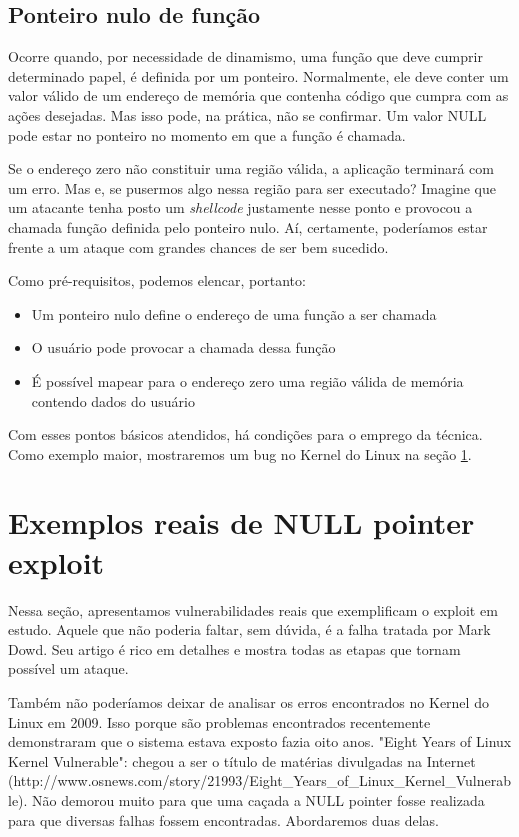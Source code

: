 			
		\subsection{Ponteiro nulo de função}
			Ocorre quando, por necessidade de dinamismo, uma função que deve cumprir determinado
			papel, é definida por um ponteiro. Normalmente, ele deve conter um valor válido
			de um endereço de memória que contenha código que cumpra com as ações desejadas.
			Mas isso pode, na prática, não se confirmar. Um valor NULL pode estar no ponteiro
			no momento em que a função é chamada.

			
			Se o endereço zero não constituir uma região válida, a aplicação terminará com um erro.
			Mas e, se pusermos algo nessa região para ser executado? Imagine que um atacante tenha
			posto um \textsl{shellcode} justamente nesse ponto e provocou a chamada função definida pelo
			ponteiro nulo. Aí, certamente, poderíamos estar frente a um ataque com grandes chances de
			ser bem sucedido.
			

			Como pré-requisitos, podemos elencar, portanto:
			\begin{itemize}
				\item{Um ponteiro nulo define o endereço de uma função a ser chamada}
				\item{O usuário pode provocar a chamada dessa função}
				\item{É possível mapear para o endereço zero uma região válida de memória contendo dados do usuário}
			\end{itemize}
			Com esses pontos básicos atendidos, há condições para o emprego da técnica.
			Como exemplo maior, mostraremos um bug no Kernel do Linux na seção \ref{sec:exemplos_null_pointer}. 


	\section{Exemplos reais de NULL pointer exploit}
	\label{sec:exemplos_null_pointer}

		Nessa seção, apresentamos vulnerabilidades reais que exemplificam o exploit em estudo.
		Aquele que não poderia faltar, sem dúvida, é a falha tratada por Mark Dowd.
		Seu artigo é rico em detalhes e mostra todas as etapas que tornam possível
		um ataque.


		Também não poderíamos deixar de analisar os erros encontrados no Kernel do Linux em 2009.
		Isso porque são problemas encontrados recentemente demonstraram que o sistema estava exposto
		fazia oito anos. "Eight Years of Linux Kernel Vulnerable": chegou a ser o título de matérias
		divulgadas na Internet (http://www.osnews.com/story/21993/Eight\_Years\_of\_Linux\_Kernel\_Vulnerable).
		Não demorou muito para que uma caçada a NULL pointer fosse realizada para que diversas falhas
		fossem encontradas. Abordaremos duas delas.
			

